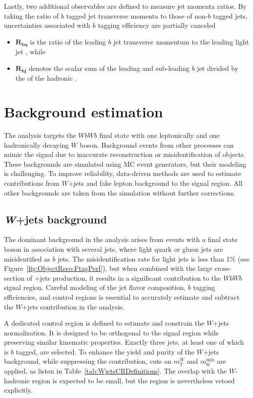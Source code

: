 \noindent
Lastly, two additional observables are defined to measure jet momenta ratios.
By taking the ratio of
$b$ tagged jet transverse momenta to those of non-$b$ tagged jets, uncertainties associated with
$b$ tagging efficiency are partially canceled\begin{itemize}
\item \( \bm{R_{bq} } \) is the ratio of the leading $b$ jet transverse momentum to the leading light jet \pt, while
\item \( \bm{R_{bj} } \) denotes the scalar sum of the leading and sub-leading $b$ jet \pt divided by the \pt of the hadronic \Wboson.
\end{itemize}


\section{Background estimation}
\label{sec:background}

The analysis targets the
$WbWb$ final state with one leptonically and one hadronically decaying
$W$ boson. Background events from other processes
can mimic the signal due to inaccurate reconstruction or misidentification of objects.
These backgrounds are simulated using MC event generators, but their modeling is challenging. To improve reliability, data-driven methods are used to estimate contributions from $W$+jets and fake lepton background to the signal region.
All other backgrounds are taken from the simulation without further corrections.

\subsection{\textit{W}+jets background}

The dominant background in the analysis arises from events with a final state \Wboson boson in association with several jets,
where light quark or gluon jets are misidentified as $b$ jets. 
The misidentification rate for light jets is less than 1\% (see Figure~\ref{fig:ObjectReco:FtagPerf}),
but when combined with the large cross-section of \Wboson+jets production, it results in a significant contribution to the $WbWb$ signal region.
Careful modeling of the jet flavor composition, $b$ tagging efficiencies, and control regions is essential to accurately estimate and subtract the $W$+jets contribution in the analysis.

A dedicated control region is defined to estimate and constrain the $W$+jets normalization. It is designed to be orthogonal to the signal region
while preserving similar kinematic properties.
Exactly three jets, at least one of which is $b$ tagged, are selected.
To enhance the yield and purity of the $W$+jets background, while suppressing the \ttbar contribution, cuts on
$m_T^W$ and $m_{bl}^\text{min}$ are applied, as listen in Table~\ref{tab:WjetsCRDefinitions}. The overlap with the $W$-hadronic region is expected to be small, but the region is nevertheless vetoed explicitly.

